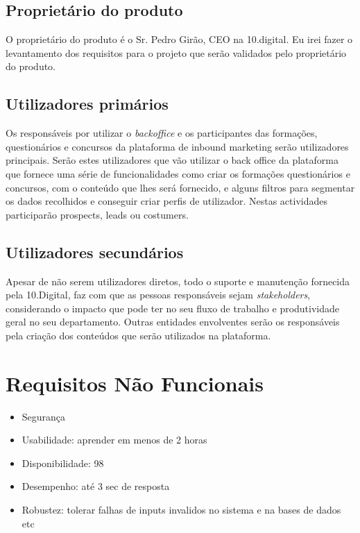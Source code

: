\subsection{Proprietário do produto}

O proprietário do produto é o Sr. Pedro Girão, CEO na 10.digital. Eu irei fazer o levantamento dos requisitos para o projeto que serão validados pelo proprietário do produto.

\subsection{Utilizadores primários}

Os responsáveis por utilizar o \textit{backoffice} e os participantes das formações, questionários e concursos da plataforma de inbound marketing serão utilizadores principais. Serão estes utilizadores que vão utilizar o back office da plataforma que fornece uma série de funcionalidades como criar os formações questionários e concursos, com o conteúdo que lhes será fornecido, e alguns filtros para segmentar os dados recolhidos e conseguir criar perfis de utilizador. Nestas actividades participarão prospects, leads ou costumers.


\subsection{Utilizadores secundários}

Apesar de não serem utilizadores diretos, todo o suporte e manutenção fornecida pela 10.Digital, faz com que as pessoas responsáveis sejam \textit{stakeholders}, considerando o impacto que pode ter no seu fluxo de trabalho e produtividade geral no seu departamento. 
Outras entidades envolventes serão os responsáveis pela criação dos conteúdos que serão utilizados na plataforma.


\section{Requisitos Não Funcionais}
\label{rnf}
\begin{itemize}
	\item Segurança
	\item Usabilidade: aprender em menos de 2 horas
	\item Disponibilidade: 98
	\item Desempenho: até 3 sec de resposta
	\item Robustez: tolerar falhas de inputs invalidos no sistema e na bases de dados etc
\end{itemize}

